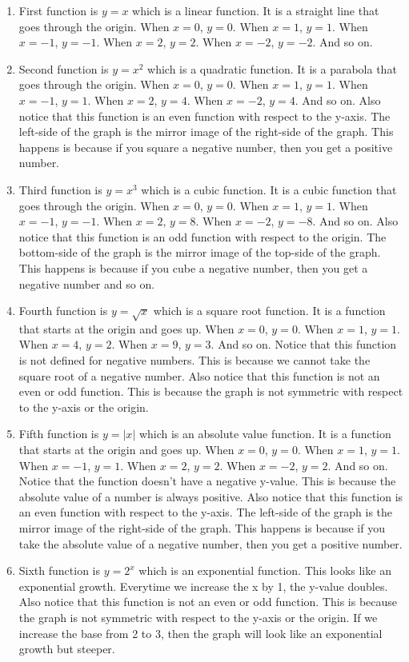 \begin{enumerate}
	\item First function is $y=x$ which is a linear function. It is a straight line that goes through the origin. When $x=0$, $y=0$. When $x=1$, $y=1$. When $x=-1$, $y=-1$. When $x=2$, $y=2$. When $x=-2$, $y=-2$. And so on. 
	\item Second function is $y=x^2$ which is a quadratic function. It is a parabola that goes through the origin. When $x=0$, $y=0$. When $x=1$, $y=1$. When $x=-1$, $y=1$. When $x=2$, $y=4$. When $x=-2$, $y=4$. And so on. Also notice that this function is an even function with respect to the y-axis. The left-side of the graph is the mirror image of the right-side of the graph. This happens is because if you square a negative number, then you get a positive number.
	\item Third function is $y=x^3$ which is a cubic function. It is a cubic function that goes through the origin. When $x=0$, $y=0$. When $x=1$, $y=1$. When $x=-1$, $y=-1$. When $x=2$, $y=8$. When $x=-2$, $y=-8$. And so on. Also notice that this function is an odd function with respect to the origin. The bottom-side of the graph is the mirror image of the top-side of the graph. This happens is because if you cube a negative number, then you get a negative number and so on.
	\item Fourth function is $y=\sqrt{x}$ which is a square root function. It is a function that starts at the origin and goes up. When $x=0$, $y=0$. When $x=1$, $y=1$. When $x=4$, $y=2$. When $x=9$, $y=3$. And so on. Notice that this function is not defined for negative numbers. This is because we cannot take the square root of a negative number. Also notice that this function is not an even or odd function. This is because the graph is not symmetric with respect to the y-axis or the origin.
	\item Fifth function is $y=|x|$ which is an absolute value function. It is a function that starts at the origin and goes up. When $x=0$, $y=0$. When $x=1$, $y=1$. When $x=-1$, $y=1$. When $x=2$, $y=2$. When $x=-2$, $y=2$. And so on. Notice that the function doesn't have a negative y-value. This is because the absolute value of a number is always positive. Also notice that this function is an even function with respect to the y-axis. The left-side of the graph is the mirror image of the right-side of the graph. This happens is because if you take the absolute value of a negative number, then you get a positive number.
	\item Sixth function is $y=2^x$ which is an exponential function. This looks like an exponential growth. Everytime we increase the x by 1, the y-value doubles. Also notice that this function is not an even or odd function. This is because the graph is not symmetric with respect to the y-axis or the origin. If we increase the base from 2 to 3, then the graph will look like an exponential growth but steeper.

\end{enumerate}
